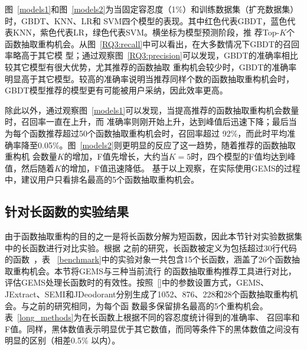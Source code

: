 图~\ref{models1}和图~\ref{models2}为当固定容忍度（1\%）和训练数据集（扩充数据集）时，GBDT、KNN、LR和
SVM四个模型的表现。其中红色代表GBDT，蓝色代表KNN，紫色代表LR，绿色代表SVM。横坐标为模型预测阶段，推
荐Top-$K$个函数抽取重构机会。从图~\ref{RQ3:recall}中可以看出，在大多数情况下GBDT的召回率略高于其它模
型；通过观察图~\ref{RQ3:precision}可以发现，GBDT的准确率相比较其它模型有很大优势，尤其推荐的函数抽取
重构机会较少时，GBDT的准确率明显高于其它模型。较高的准确率说明当推荐同样个数的函数抽取重构机会时，
GBDT模型推荐的模型更有可能被用户采纳，因此效率更高。

除此以外，通过观察图~\ref{models1}可以发现，当提高推荐的函数抽取重构机会数量时，召回率一直在上升，而
准确率则刚开始上升，达到峰值后迅速下降；最后当为每个函数推荐超过50个函数抽取重构机会时，召回率超过
92\%，而此时平均准确率降至0.05\%。图~\ref{models2}则更明显的反应了这一趋势，随着推荐的函数抽取重构机
会数量$K$的增加，F值先增长，大约当$K=5$时，四个模型的F值均达到峰值，然后随着$K$的增加，F值迅速降低。
基于以上观察，在实际使用GEMS的过程中，建议用户只看排名最高的5个函数抽取重构机会。

\subsection{针对长函数的实验结果}\label{RQ4}
由于函数抽取重构的目的之一是将长函数分解为短函数，因此本节针对实验数据集中的长函数进行对比实验。根据
之前的研究，长函数被定义为包括超过30行代码的函数~\cite{charalampidou2016identifying}，表
~\ref{benchmark}中的实验对象一共包含15个长函数，涵盖了26个函数抽取重构机会。本节将GEMS与三种当前流行
的函数抽取重构推荐工具进行对比，评估GEMS处理长函数时的有效性。按照~\ref{}中的参数设置方式，GEMS、
JExtract、SEMI和JDeodorant分别生成了1052、876、228和28个函数抽取重构机会。与之前的研究相同，为每个函
数最多保留排名最高的5个重构机会。表~\ref{long_methods}为在长函数上根据不同的容忍度统计得到的准确率、
召回率和F值。同样，黑体数值表示明显优于其它数值，而同等条件下的黑体数值之间没有明显的区别（相差0.5\%
以内）。

